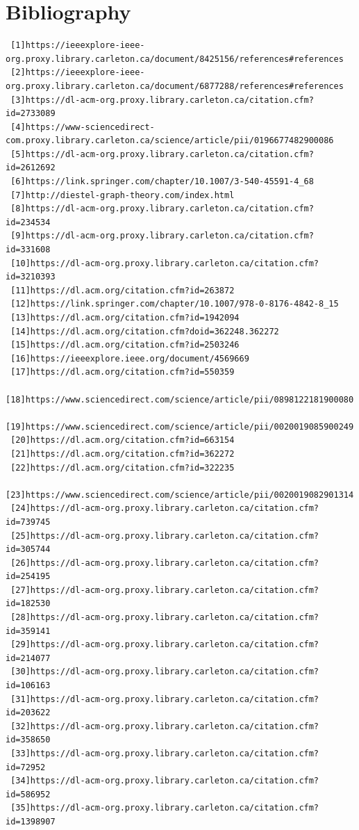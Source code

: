 \documentclass[]{article}
\begin{document}
 \section{Bibliography}
 \begin{verbatim}
 [1]https://ieeexplore-ieee-org.proxy.library.carleton.ca/document/8425156/references#references
 [2]https://ieeexplore-ieee-org.proxy.library.carleton.ca/document/6877288/references#references
 [3]https://dl-acm-org.proxy.library.carleton.ca/citation.cfm?id=2733089
 [4]https://www-sciencedirect-com.proxy.library.carleton.ca/science/article/pii/0196677482900086
 [5]https://dl-acm-org.proxy.library.carleton.ca/citation.cfm?id=2612692
 [6]https://link.springer.com/chapter/10.1007/3-540-45591-4_68
 [7]http://diestel-graph-theory.com/index.html
 [8]https://dl-acm-org.proxy.library.carleton.ca/citation.cfm?id=234534 
 [9]https://dl-acm-org.proxy.library.carleton.ca/citation.cfm?id=331608
 [10]https://dl-acm-org.proxy.library.carleton.ca/citation.cfm?id=3210393
 [11]https://dl.acm.org/citation.cfm?id=263872
 [12]https://link.springer.com/chapter/10.1007/978-0-8176-4842-8_15
 [13]https://dl.acm.org/citation.cfm?id=1942094
 [14]https://dl.acm.org/citation.cfm?doid=362248.362272
 [15]https://dl.acm.org/citation.cfm?id=2503246
 [16]https://ieeexplore.ieee.org/document/4569669
 [17]https://dl.acm.org/citation.cfm?id=550359
 [18]https://www.sciencedirect.com/science/article/pii/0898122181900080
 [19]https://www.sciencedirect.com/science/article/pii/0020019085900249
 [20]https://dl.acm.org/citation.cfm?id=663154
 [21]https://dl.acm.org/citation.cfm?id=362272
 [22]https://dl.acm.org/citation.cfm?id=322235
 [23]https://www.sciencedirect.com/science/article/pii/0020019082901314
 [24]https://dl-acm-org.proxy.library.carleton.ca/citation.cfm?id=739745
 [25]https://dl-acm-org.proxy.library.carleton.ca/citation.cfm?id=305744
 [26]https://dl-acm-org.proxy.library.carleton.ca/citation.cfm?id=254195
 [27]https://dl-acm-org.proxy.library.carleton.ca/citation.cfm?id=182530
 [28]https://dl-acm-org.proxy.library.carleton.ca/citation.cfm?id=359141
 [29]https://dl-acm-org.proxy.library.carleton.ca/citation.cfm?id=214077
 [30]https://dl-acm-org.proxy.library.carleton.ca/citation.cfm?id=106163
 [31]https://dl-acm-org.proxy.library.carleton.ca/citation.cfm?id=203622
 [32]https://dl-acm-org.proxy.library.carleton.ca/citation.cfm?id=358650
 [33]https://dl-acm-org.proxy.library.carleton.ca/citation.cfm?id=72952
 [34]https://dl-acm-org.proxy.library.carleton.ca/citation.cfm?id=586952
 [35]https://dl-acm-org.proxy.library.carleton.ca/citation.cfm?id=1398907

\end{verbatim}
\end{document}
